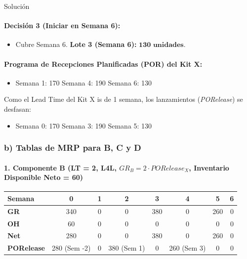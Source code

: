 \documentclass[11pt, a4paper]{article}
\begin{document}
\begin{ejercicio}{Solución}
  \paragraph{Decisión 3 (Iniciar en Semana 6):}
  \begin{itemize}
    \item Cubre Semana 6. \textbf{Lote 3 (Semana 6):} $\mathbf{130 \text{ unidades}}$.
  \end{itemize}

  \paragraph{Programa de Recepciones Planificadas (POR) del Kit X:}
  \begin{itemize}
    \item Semana 1: 170 \quad Semana 4: 190 \quad Semana 6: 130
  \end{itemize}
  Como el Lead Time del Kit X is de 1 semana, los lanzamientos (\textit{PORelease}) se desfasan:
  \begin{itemize}
    \item Semana 0: 170 \quad Semana 3: 190 \quad Semana 5: 130
  \end{itemize}

  \subsubsection*{b) Tablas de MRP para B, C y D}

  \paragraph{1. Componente B (LT = 2, L4L, $GR_B = 2 \cdot PORelease_X$, Inventario Disponible Neto = 60)}
  \begin{center}
  \small
  \begin{tabular}{lccccccc}
    \toprule
    \textbf{Semana} & \textbf{0} & \textbf{1} & \textbf{2} & \textbf{3} & \textbf{4} & \textbf{5} & \textbf{6} \\
    \midrule
    \textbf{GR} & 340 & 0 & 0 & 380 & 0 & 260 & 0 \\
    \textbf{OH} & 60 & 0 & 0 & 0 & 0 & 0 & 0 \\
    \textbf{Net} & 280 & 0 & 0 & 380 & 0 & 260 & 0 \\
    \textbf{PORelease} & 280 (Sem -2) & 0 & 380 (Sem 1) & 0 & 260 (Sem 3) & 0 & 0 \\
    \bottomrule
  \end{tabular}
  \end{center}


\end{ejercicio}
\end{document}

